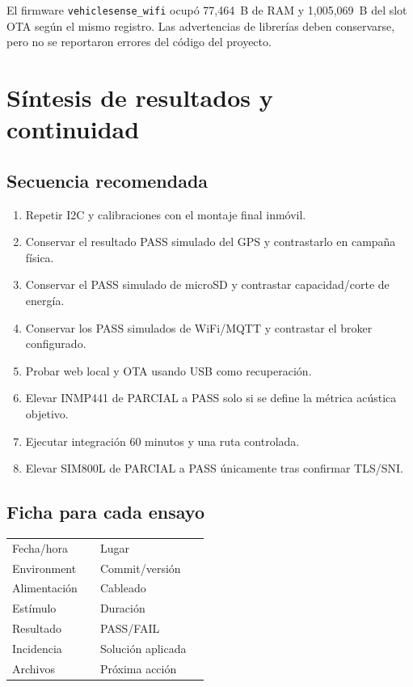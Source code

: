 \documentclass[11pt,a4paper,oneside]{report}
\begin{document}
El firmware \texttt{vehiclesense\_wifi} ocupó 77,464~B de RAM y 1,005,069~B del
slot OTA según el mismo registro. Las advertencias de librerías deben conservarse,
pero no se reportaron errores del código del proyecto.

\chapter{Síntesis de resultados y continuidad}

\section{Secuencia recomendada}
\begin{enumerate}
  \item Repetir I2C y calibraciones con el montaje final inmóvil.
  \item Conservar el resultado PASS simulado del GPS y contrastarlo en campaña física.
  \item Conservar el PASS simulado de microSD y contrastar capacidad/corte de energía.
  \item Conservar los PASS simulados de WiFi/MQTT y contrastar el broker configurado.
  \item Probar web local y OTA usando USB como recuperación.
  \item Elevar INMP441 de PARCIAL a PASS solo si se define la métrica acústica objetivo.
  \item Ejecutar integración 60 minutos y una ruta controlada.
  \item Elevar SIM800L de PARCIAL a PASS únicamente tras confirmar TLS/SNI.
\end{enumerate}

\section{Ficha para cada ensayo}
\begin{table}[H]\centering
\begin{tabularx}{\textwidth}{@{}l Y l Y@{}}
\toprule
Fecha/hora & & Lugar & \\
Environment & & Commit/versión & \\
Alimentación & & Cableado & \\
Estímulo & & Duración & \\
Resultado & & PASS/FAIL & \\
Incidencia & & Solución aplicada & \\
Archivos & & Próxima acción & \\
\bottomrule
\end{tabularx}
\end{table}
\end{document}
